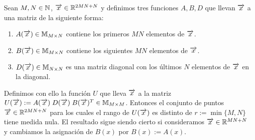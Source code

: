 \begin{lema} \label{lema:primer_lema}

    Sean $M, N \in \mathbb{N}$, $\overrightarrow{x} \in \mathbb{R}^{2MN + N}$ y definimos tres funciones $A, B, D$ que llevan $\overrightarrow{x}$ a una matriz de la siguiente forma:

    \begin{enumerate}
        \item $A(\overrightarrow{x}) \in \mathbb{M}_{M \times N}$ contiene los primeros $MN$ elementos de $\overrightarrow{x}$.
        \item $B(\overrightarrow{x}) \in \mathbb{M}_{M \times N}$ contiene los siguientes $MN$ elementos de $\overrightarrow{x}$.
        \item $D(\overrightarrow{x}) \in \mathbb{M}_{N \times N}$ es una matriz diagonal con los últimos $N$ elementos de $\overrightarrow{x}$ en la diagonal.
    \end{enumerate}

    Definimos con ello la función $U$ que lleva $\overrightarrow{x}$ a la matriz $U(\overrightarrow{x}) := A(\overrightarrow{x}) \; D(\overrightarrow{x}) \; B(\overrightarrow{x})^T \in \mathbb{M}_{M \times M}$. Entonces el conjunto de puntos $\overrightarrow{x} \in \mathbb{R}^{2MN + N}$ para los cuales el rango de $U(\overrightarrow{x})$ es distinto de $r := \min \{M, N\}$ tiene medida nula. El resultado sigue siendo cierto si consideramos $\overrightarrow{x} \in \mathbb{R}^{MN+N}$ y cambiamos la asignación de $B(x)$ por $B(x) := A(x)$.
\end{lema}

